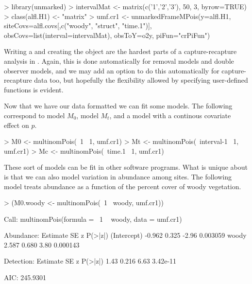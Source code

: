 \documentclass[a4paper]{article}
\renewenvironment{Schunk}{\vspace{\topsep}}{\vspace{\topsep}}
\begin{document}
\begin{Schunk}
\begin{Sinput}
> library(unmarked)
> intervalMat <- matrix(c('1','2','3'), 50, 3, byrow=TRUE)
> class(alfl.H1) <- "matrix"
> umf.cr1 <- unmarkedFrameMPois(y=alfl.H1,
     siteCovs=alfl.covs[,c("woody", "struct", "time.1")],
     obsCovs=list(interval=intervalMat),
     obsToY=o2y, piFun="crPiFun")
\end{Sinput}
\end{Schunk}


Writing a  and creating the  object are
the hardest parts of a capture-recapture analysis in
. Again, this is done automatically for removal models
and double observer models, and we may add an option to do this
automatically for capture-recapture data too, but hopefully
the flexibility allowed by specifying user-defined
functions is evident. %

Now that we have our data formatted we can fit some models. The
following correspond to model $M_0$, model $M_t$, and a model with a
continous covariate effect on $p$.


\begin{Schunk}
\begin{Sinput}
> M0 <- multinomPois(~1 ~1, umf.cr1)
> Mt <- multinomPois(~interval-1 ~1, umf.cr1)
> Mc <- multinomPois(~time.1 ~1, umf.cr1)
\end{Sinput}
\end{Schunk}

These sort of models can be fit in other software programs. What is
unique about  is that we can also model variation in
abundance among sites. The following model treats abundance as
a function of the percent cover of woody vegetation.

\begin{Schunk}
\begin{Sinput}
> (M0.woody <- multinomPois(~1 ~woody, umf.cr1))
\end{Sinput}
\begin{Soutput}
Call:
multinomPois(formula = ~1 ~ woody, data = umf.cr1)

Abundance:
            Estimate    SE     z  P(>|z|)
(Intercept)   -0.962 0.325 -2.96 0.003059
woody          2.587 0.680  3.80 0.000143

Detection:
 Estimate    SE    z  P(>|z|)
     1.43 0.216 6.63 3.42e-11

AIC: 245.9301 
\end{Soutput}
\end{Schunk}
\end{document}
